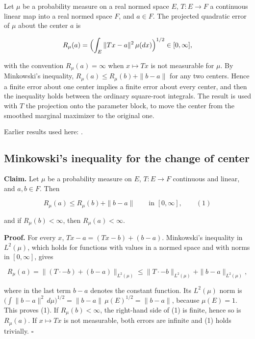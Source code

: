 \documentclass[11pt,a4paper]{report}
\begin{document}
Let \(\mu\) be a probability measure on a real normed space \(E\), \(T:E\to F\) a continuous linear map into a real normed space \(F\), and \(a\in F\). The projected quadratic error of \(\mu\) about the center \(a\) is


\[R_\mu(a)=\Bigl(\int_E\|Tx-a\|^2\,\mu(dx)\Bigr)^{1/2}\in[0,\infty],\]


with the convention \(R_\mu(a)=\infty\) when \(x\mapsto Tx\) is not measurable for \(\mu\). By Minkowski's inequality, \(R_\mu(a)\le R_\mu(b)+\|b-a\|\) for any two centers. Hence a finite error about one center implies a finite error about every center, and then the inequality holds between the ordinary square-root integrals. The result is used with \(T\) the projection onto the parameter block, to move the center from the smoothed marginal maximizer to the original one.



Earlier results used here: \cite[Section~3.48]{LangevinLean2026ULASC}.
\subsection{\texorpdfstring{Minkowski's inequality for the change of center}{Minkowski's inequality for the change of center}}
\label{report-step-ProximalLangevin-ProjectionCenter-lean-1}


\textbf{Claim.} Let \(\mu\) be a probability measure on \(E\), \(T:E\to F\) continuous and linear, and \(a,b\in F\). Then


\[R_\mu(a)\le R_\mu(b)+\|b-a\|\qquad\text{in }[0,\infty],\qquad(1)\]


and if \(R_\mu(b)<\infty\), then \(R_\mu(a)<\infty\).




\textbf{Proof.} For every \(x\), \(Tx-a=(Tx-b)+(b-a)\). Minkowski's inequality in \(L^2(\mu)\), which holds for functions with values in a normed space and with norms in \([0,\infty]\), gives


\[R_\mu(a)=\bigl\|(T\cdot-b)+(b-a)\bigr\|_{L^2(\mu)}\le\|T\cdot-b\|_{L^2(\mu)}+\|b-a\|_{L^2(\mu)},\]


where in the last term \(b-a\) denotes the constant function. Its \(L^2(\mu)\) norm is \(\bigl(\int\|b-a\|^2\,d\mu\bigr)^{1/2}=\|b-a\|\,\mu(E)^{1/2}=\|b-a\|\), because \(\mu(E)=1\). This proves (1). If \(R_\mu(b)<\infty\), the right-hand side of (1) is finite, hence so is \(R_\mu(a)\). If \(x\mapsto Tx\) is not measurable, both errors are infinite and (1) holds trivially. \(\square\)
\end{document}

